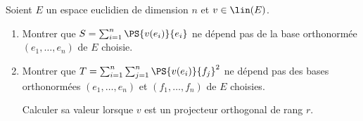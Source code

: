 \begin{enonce}
\begin{exercise}[ID={RMS126 E867},subtitle={CCP MP 2015},tags={}, difficulty={0}]
Soient $E$ un espace euclidien de dimension $n$ et $v\in\lin(E)$.
\begin{enumerate}
  \item Montrer que $S=\sum_{i=1}^n \PS{v(e_i)}{e_i}$ ne dépend pas de la base orthonormée $(e_1,\dots,e_n)$ de $E$ choisie.

  \item Montrer que $T=\sum_{i=1}^n \sum_{j=1}^n \PS{v(e_i)}{f_j}^2$ ne dépend pas des bases orthonormées  $(e_1,\dots,e_n)$ et $(f_1,\dots,f_n)$ de $E$ choisies.

    Calculer sa valeur lorsque $v$ est un projecteur orthogonal de rang $r$.
\end{enumerate}
\end{exercise}
\begin{solution}
\end{solution}
\end{enonce}
